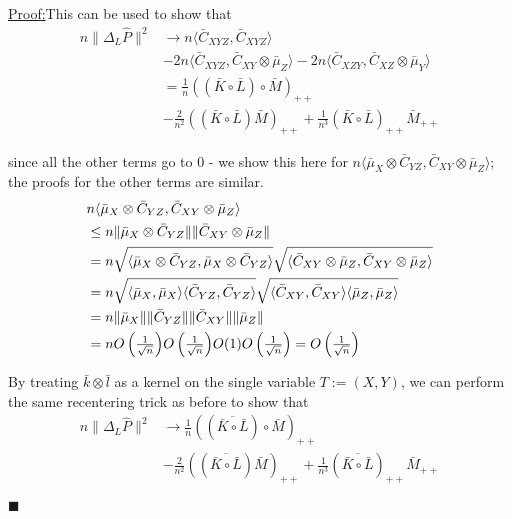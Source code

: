 \documentclass{article}
\newenvironment{claimproof}[1]{\par\noindent\underline{Proof:}\space#1}{\hfill $\blacksquare$}
\begin{document}
\begin{claimproof}
This can be used to show that 
\begin{align*}
n\|\Delta_L \hat{P}\|^2 & \longrightarrow n\langle \bar{C}_{XYZ},\bar{C}_{XYZ} \rangle \\ &-
2n\langle \bar{C}_{XYZ},\bar{C}_{XY}\otimes\bar{\mu}_Z \rangle -
2n\langle \bar{C}_{XZY},\bar{C}_{XZ}\otimes\bar{\mu}_Y \rangle \\ &=
\frac{1}{n}((\bar{K}\circ \bar{L}) \circ \bar{M})_{++}\\& - \frac{2}{n^2}((\bar{K}\circ \bar{L})\bar{M})_{++} + \frac{1}{n^3}(\bar{K}\circ \bar{L})_{++}\bar{M}_{++}
\end{align*}

since all the other terms go to 0 - we show this here for $n\langle \bar{\mu}_X\otimes\bar{C}_{YZ},\bar{C}_{XY}\otimes\bar{\mu}_Z \rangle$; the proofs for the other terms are similar.
\begin{align*}
&n\langle \bar{\mu}_X\otimes\bar{C}_{YZ},\bar{C}_{XY}\otimes\bar{\mu}_Z \rangle \\
&\leq n \| \bar{\mu}_X\otimes\bar{C}_{YZ}\| \|\bar{C}_{XY}\otimes\bar{\mu}_Z \| \\
& = n\sqrt{\langle \bar{\mu}_X\otimes\bar{C}_{YZ} , \bar{\mu}_X\otimes\bar{C}_{YZ} \rangle} \sqrt{\langle \bar{C}_{XY}\otimes\bar{\mu}_Z, \bar{C}_{XY}\otimes\bar{\mu}_Z \rangle} \\
& = n\sqrt{\langle \bar{\mu}_X, \bar{\mu}_X \rangle \langle \bar{C}_{YZ} , \bar{C}_{YZ} \rangle} \sqrt{\langle \bar{C}_{XY}, \bar{C}_{XY} \rangle \langle \bar{\mu}_Z, \bar{\mu}_Z \rangle} \\
& =  n \| \bar{\mu}_X\|\|\bar{C}_{YZ}\| \|\bar{C}_{XY}\|\|\bar{\mu}_Z \| \\
& = n \mathsmaller{O\left(\frac{1}{\sqrt{n}}\right)} \mathsmaller{O\left(\frac{1}{\sqrt{n}}\right)} O(1) \mathsmaller{O\left(\frac{1}{\sqrt{n}}\right)} = \mathsmaller{O\left(\frac{1}{\sqrt{n}}\right)}
\end{align*}

By treating $\bar{k}\otimes\bar{l}$ as a kernel on the single variable $T:=(X,Y)$, we can perform the same recentering trick as before to show that 
\begin{align*}
n\|\Delta_L \hat{P}\|^2 & \longrightarrow \frac{1}{n}((\overline{\bar{K}\circ \bar{L}}) \circ \bar{M})_{++}\\& - \frac{2}{n^2}((\overline{\bar{K}\circ \bar{L}})\bar{M})_{++} + \frac{1}{n^3}(\overline{\bar{K}\circ \bar{L}})_{++}\bar{M}_{++}
\end{align*}


\end{claimproof}
\end{document}
